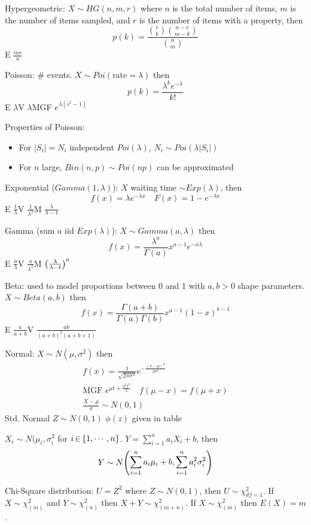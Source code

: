 \documentclass[letterpaper, 8pt]{extarticle}
\begin{document}
\begin{multicols*}{3}
	Hypergeometric: $X\sim HG(n,m,r)$ where $n$ is the total number of items, $m$ is the number of items sampled, and $r$ is the number of items with a property, then
	\[p(k)=\frac{\binom{r}{k}\binom{n-r}{m-k}}{\binom{n}{m}} \tag{$k\IN 0,\cdots, \min(r,m)$}\]
	E $\frac{mr}{n}$
	
	Poisson: \# events. $X\sim Poi(\text{rate}=\lambda)$ then
	\[p(k)=\frac{\lambda^ke^{-\lambda}}{k!}\]
	E $\lambda$\quad V $\lambda$\quad MGF $e^{\lambda(e^t-1)}$
	
	Properties of Poisson:
	\begin{itemize}
		\item For $|S_i|=N_i$ independent $Poi(\lambda)$, $N_i\sim Poi(\lambda|S_i|)$
		\item For $n$ large, $Bin(n,p)\sim Poi(np)$ can be approximated
	\end{itemize}
	
	Exponential ($Gamma(1,\lambda)$): $X$ waiting time $\sim Exp(\lambda)$, then 
	\[f(x)=\lambda e^{-\lambda x}\quad F(x)=1-e^{-\lambda x}\]
	E $\frac{1}{\lambda}$\quad V $\frac{1}{\lambda^2}$\quad M $\frac{\lambda}{\lambda-t}$
	
	Gamma (sum $a$ iid $Exp(\lambda)$): $X\sim Gamma(a,\lambda)$ then
	\[f(x)=\frac{\lambda^a}{\Gamma(a)}x^{a-1}e^{-x\lambda}\]
	E $\frac{a}{\lambda}$\quad V $\frac{a}{\lambda^2}$\quad M $\mqty(\frac{\lambda}{\lambda-t})^a$
	
	Beta: used to model proportions between $0$ and $1$ with $a,b>0$ shape parameters. $X\sim Beta(a,b)$ then
	\[f(x)=\frac{\Gamma(a+b)}{\Gamma(a)\Gamma(b)}x^{a-1}(1-x)^{b-1}\]
	E $\frac{a}{a+b}$\quad V $\frac{ab}{(a+b)^2(a+b+1)}$
	
	Normal: $X\sim N(\mu, \sigma^2)$ then 
	\begin{gather*}
		f(x)=\frac{1}{\sqrt{2\pi\sigma^2}}e^{-\frac{(x-\mu)^2}{2\sigma^2}} \\
		\text{MGF } e^{\mu t+\frac{\sigma^2t^2}{2}}\quad f(\mu-x)=f(\mu+x) \\
		\frac{X-\mu}{\sigma}\sim N(0,1)
	\end{gather*}
	Std. Normal $Z\sim N(0,1)$ $\phi(z)$ given in table
	
	$X_i\sim N(\mu_i,\sigma^2_i$ for $i\,{\in}\,\{1,\cdots,n\}$. $Y=\sum_{i=1}^na_iX_i+b$, then
	\[Y\sim N\mqty(\displaystyle \sum_{i=1}^na_i\mu_i+b,\sum_{i=1}^na_i^2\sigma_i^2)\]
	
	Chi-Square distribution: $U=Z^2$ where $Z\sim N(0,1)$, then $U\sim\chi^2_{df=1}$. If $X\sim \chi^2_{(m)}$ and $Y\sim \chi^2_{(n)}$ then $X+Y\sim \chi^2_{(m+n)}$. If $X\sim\chi^2_{(m)}$ then $E(X)=m$.
	

\end{multicols*}
\end{document}
